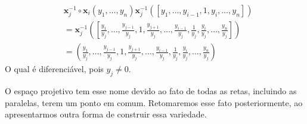 \begin{examples}
    \begin{align*}
         & \mathbf{x}_{j}^{-1}\circ \mathbf{x}_{i}(y_{1}, \dots, y_{n})\mathbf{x}_{j}^{-1}([y_{1}, \dots, y_{i-1}, 1, y_{i}, \dots, y_{n}])                                                                                              \\
         & =\mathbf{x}_{j}^{-1}\left( \left[ \frac{y_{1}}{y_{j}}, \dots, \frac{y_{j-1}}{y_{j}}, 1, \frac{y_{j+1}}{y_{j}}, \dots, \frac{y_{i-1}}{y_{j}}, \frac{1}{y_{j}}, \frac{y_{i}}{y_{j}}, \dots, \frac{y_{n}}{y_{j}} \right] \right) \\
         & = (\frac{y_{1}}{y_{j}}, \dots, \frac{y_{j-1}}{y_{j}}, 1, \frac{y_{j+1}}{y_{j}}, \dots, \frac{y_{i-1}}{y_{j}}, \frac{1}{y_{j}}, \frac{y_{i}}{y_{j}}, \dots, \frac{y_{n}}{y_{j}} )
    \end{align*}
    O qual é diferenciável, pois $y_{j}\neq0$.
\end{examples}
O espaço projetivo tem esse nome devido ao fato de todas as retas, incluindo as paralelas, terem um ponto em comum. Retomaremos esse fato posteriormente, ao apresentarmos outra forma de construir essa variedade.

